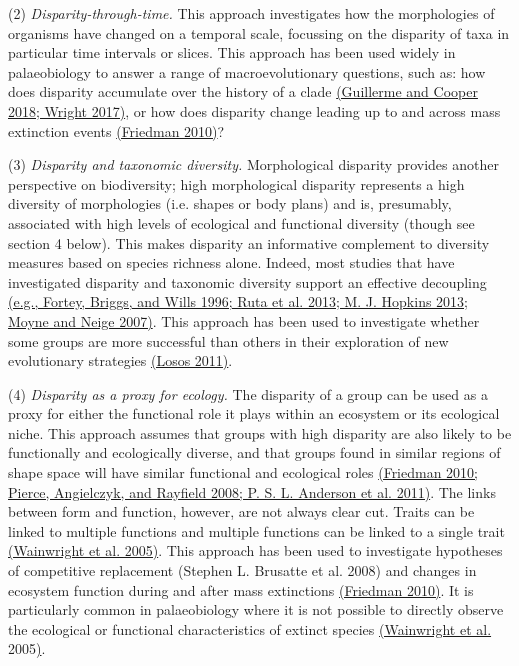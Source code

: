 \documentclass[12pt,letterpaper]{article}
\begin{document}
(2) \emph{Disparity-through-time.} This approach investigates how the morphologies of organisms have changed on a temporal scale, focussing on the disparity of taxa in particular time intervals or slices.
This approach has been used widely in palaeobiology to answer a range of macroevolutionary questions, such as: how does disparity accumulate over the history of a clade \href{https://paperpile.com/c/sTGYvp/ekU4+s33b}{(Guillerme and Cooper 2018; Wright 2017)}, or how does disparity change leading up to and across mass extinction events \href{https://paperpile.com/c/sTGYvp/EETc}{(Friedman 2010)}?

(3) \emph{Disparity and taxonomic diversity.} Morphological disparity provides another perspective on biodiversity; high morphological disparity represents a high diversity of morphologies (i.e. shapes or body plans) and is, presumably, associated with high levels of ecological and functional diversity (though see section 4 below).
This makes disparity an informative complement to diversity measures based on species richness alone. Indeed, most studies that have investigated disparity and taxonomic diversity support an effective decoupling \href{https://paperpile.com/c/sTGYvp/2tbJ+geAO+hea5+aVVj}{(e.g., Fortey, Briggs, and Wills 1996; Ruta et al. 2013; M. J. Hopkins 2013; Moyne and Neige 2007)}.
This approach has been used to investigate whether some groups are more successful than others in their exploration of new evolutionary strategies \href{https://paperpile.com/c/sTGYvp/dJHu}{(Losos 2011)}.

(4) \emph{Disparity as a proxy for ecology.} The disparity of a group can be used as a proxy for either the functional role it plays within an ecosystem or its ecological niche.
This approach assumes that groups with high disparity are also likely to be functionally and ecologically diverse, and that groups found in similar regions of shape space will have similar functional and ecological roles \href{https://paperpile.com/c/sTGYvp/EETc+tSIy+qjj9}{(Friedman 2010; Pierce, Angielczyk, and Rayfield 2008; P. S. L. Anderson et al. 2011)}.
The links between form and function, however, are not always clear cut.
Traits can be linked to multiple functions and multiple functions can be linked to a single trait \href{https://paperpile.com/c/sTGYvp/Ejzr}{(Wainwright et al. 2005)}.
This approach has been used to investigate hypotheses of competitive replacement (Stephen L. Brusatte et al. 2008) and changes in ecosystem function during and after mass extinctions \href{https://paperpile.com/c/sTGYvp/EETc}{(Friedman 2010)}.
It is particularly common in palaeobiology where it is not possible to directly observe the ecological or functional characteristics of extinct species \href{https://paperpile.com/c/sTGYvp/Ejzr}{(Wainwright et al.} 2005\href{https://paperpile.com/c/sTGYvp/Ejzr}{)}.
\end{document}
